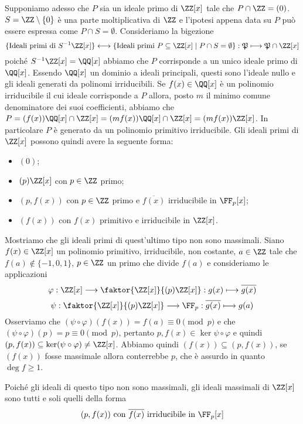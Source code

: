 \documentclass[11pt]{scrartcl}
\begin{document}
Supponiamo adesso che $P$ sia un ideale primo di $\ZZ[x]$ tale che 
$P \cap \ZZ = (0)$. $S = \ZZ\setminus \{0\}$ è una parte moltiplicativa di 
$\ZZ$ e l'ipotesi appena data su $P$ può essere espressa come $P \cap S = \emptyset$.
Consideriamo la bigezione 
\[
    \{\text{Ideali primi di }S^{-1}\ZZ[x]\}\longleftrightarrow 
    \{\text{Ideali primi } P\subseteq \ZZ[x] \mid P\cap S = \emptyset\}: 
    \mathfrak{P}\longmapsto \mathfrak{P}\cap\ZZ[x]
\]
poiché $S^{-1}\ZZ[x] = \QQ[x]$ abbiamo che $P$ corrisponde a un unico ideale
primo di $\QQ[x]$. Essendo $\QQ[x]$ un dominio a ideali principali, questi sono
l'ideale nullo e gli ideali generati da polinomi irriducibili. Se $f(x)\in \QQ[x]$
è un polinomio irriducibile il cui ideale corrisponde a $P$ allora, posto 
$m$ il minimo comune denominatore dei suoi coefficienti, abbiamo che 
$P = (f(x))\QQ[x] \cap \ZZ[x] = (mf(x))\QQ[x]\cap\ZZ[x] = (mf(x))\ZZ[x]$. 
In particolare $P$ è generato da un polinomio primitivo irriducibile.
Gli ideali primi di $\ZZ[x]$ possono quindi avere la seguente forma:
\begin{itemize}
    \item $(0)$;
    \item $(p)\ZZ[x]$ con $p \in \ZZ$ primo;
    \item $(p, f(x))$ con $p \in \ZZ$ primo e $\overline{f(x)}$ irriducibile
    in $\FF_p[x]$;
    \item $(f(x))$ con $f(x)$ primitivo e irriducibile in $\ZZ[x]$.
\end{itemize}

Mostriamo che gli ideali primi di quest'ultimo tipo non sono massimali.\newline
Siano $f(x) \in \ZZ[x]$ un polinomio primitivo, irriducibile, non costante,
$a \in \ZZ$ tale che $f(a) \notin\{-1, 0, 1\}$, $p \in \ZZ$ un primo che 
divide $f(a)$ e consideriamo le applicazioni
\[
    \varphi: \ZZ[x]\longrightarrow \faktor{\ZZ[x]}{(p)\ZZ[x]}: 
    g(x)\longmapsto \overline{g(x)}
\] 
\[
    \psi: \faktor{\ZZ[x]}{(p)\ZZ[x]}\longrightarrow \FF_p: 
    \overline{g(x)}\longmapsto g(a)
\]
Osserviamo che $(\psi\circ\varphi)(f(x)) = f(a) \equiv 0 \pmod{p}$ e che 
$(\psi\circ\varphi)(p) = p \equiv 0 \pmod{p}$, pertanto $p, f(x) \in 
\ker{\psi\circ\varphi}$ e quindi $(p, f(x)) \subseteq \ker(\psi\circ \varphi) \neq \ZZ[x]$.
Abbiamo quindi $(f(x)) \subseteq (p, f(x))$, se $(f(x))$ fosse massimale allora
conterrebbe $p$, che è assurdo in quanto $\deg f \geq 1$.

Poiché gli ideali di questo tipo non sono massimali, gli ideali massimali di
$\ZZ[x]$ sono tutti e soli quelli della forma
\[
    (p, f(x)) \text{ con }\overline{f(x)} \text{ irriducibile in }\FF_p[x]
\]
\end{document}
